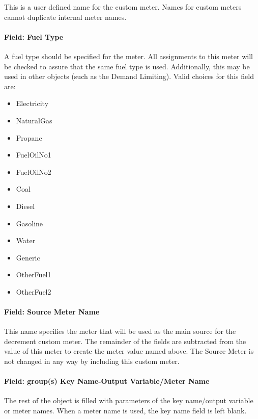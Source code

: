 This is a user defined name for the custom meter. Names for custom meters cannot duplicate internal meter names.

\paragraph{Field: Fuel Type}\label{field-fuel-type-1-003}

A fuel type should be specified for the meter. All assignments to this meter will be checked to assure that the same fuel type is used. Additionally, this may be used in other objects (such as the Demand Limiting). Valid choices for this field are:

\begin{itemize}
\item
  Electricity
\item
  NaturalGas
\item
  Propane
\item
  FuelOilNo1
\item
  FuelOilNo2
\item
  Coal
\item
  Diesel
\item
  Gasoline
\item
  Water
\item
  Generic
\item
  OtherFuel1
\item
  OtherFuel2
\end{itemize}

\paragraph{Field: Source Meter Name}\label{field-source-meter-name}

This name specifies the meter that will be used as the main source for the decrement custom meter. The remainder of the fields are subtracted from the value of this meter to create the meter value named above. The Source Meter is not changed in any way by including this custom meter.

\paragraph{Field: group(s) Key Name-Output Variable/Meter Name}\label{field-groups-key-name-output-variablemeter-name-1}

The rest of the object is filled with parameters of the key name/output variable or meter names. When a meter name is used, the key name field is left blank.

